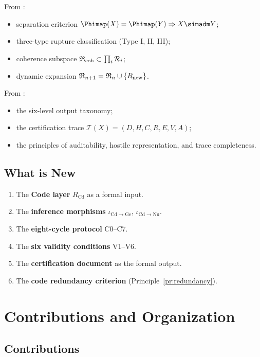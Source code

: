\documentclass[11pt,a4paper]{article}
\theoremstyle{definition}
\theoremstyle{plain}
\newcommand{\Ge}{\mathrm{Ge}}
\newcommand{\Nu}{\mathrm{Nu}}
\newcommand{\Cd}{\mathrm{Cd}}
\newcommand{\Rcal}{\mathcal{R}}
\newcommand{\Tcal}{\mathcal{T}}
\newcommand{\Rfrak}{\mathfrak{R}}
\begin{document}
From \cite{paperII}:
\begin{itemize}
  \item separation criterion $\Phimap(X) = \Phimap(Y)
        \Rightarrow X \simadm Y$;
  \item three-type rupture classification (Type I, II, III);
  \item coherence subspace $\Rfrak_{\rm coh} \subset \prod_i
        \Rcal_i$;
  \item dynamic expansion $\Rfrak_{n+1} = \Rfrak_n \cup
        \{R_{\rm new}\}$.
\end{itemize}

From \cite{paperIII}:
\begin{itemize}
  \item the six-level output taxonomy;
  \item the certification trace $\Tcal(X) = (D, H, C, R, E, V, A)$;
  \item the principles of auditability, hostile representation,
        and trace completeness.
\end{itemize}

\subsection{What is New}

\begin{enumerate}[label=(\roman*)]
  \item The \textbf{Code layer} $R_{\Cd}$ as a formal input.
  \item The \textbf{inference morphisms}
        $\iota_{\Cd \to \Ge}$, $\iota_{\Cd \to \Nu}$.
  \item The \textbf{eight-cycle protocol} C0--C7.
  \item The \textbf{six validity conditions} V1--V6.
  \item The \textbf{certification document} as the formal output.
  \item The \textbf{code redundancy criterion} (Principle~\ref{pr:redundancy}).
\end{enumerate}

\section{Contributions and Organization}
\label{sec:contributions}

\subsection{Contributions}
\end{document}
